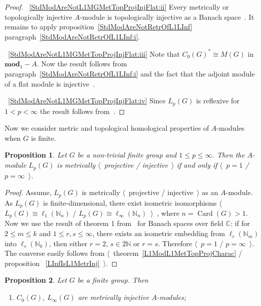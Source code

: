 \documentclass{article}
\theoremstyle{plain}
\newtheorem{proposition}{Proposition}[section]
\theoremstyle{definition}
\newtheorem{proof}{Proof}\def\theproof{}
\newcommand{\isom}{\mathop{\mathbin{\cong}}}
\begin{document}
\begin{fulltext}
\begin{proof}
~\ref{StdModAreNotL1MGMetTopProjInjFlat:ii} Every metrically or topologically
injective $A$-module is topologically injective as a Banach
space~\cite[proposition 3.8]{NemGeomProjInjFlatBanMod}. It remains to apply
proposition~\ref{StdModAreNotRetrOfL1LInf}
paragraph~\ref{StdModAreNotRetrOfL1LInf:i}.

~\ref{StdModAreNotL1MGMetTopProjInjFlat:iii} Note that ${C_0(G)}^*\isom M(G)$ in
$\mathbf{mod}_1-A$. Now the result follows from
paragraph~\ref{StdModAreNotRetrOfL1LInf:i} and the fact that the adjoint module
of a flat module is injective~\cite[proposition
2.21]{NemGeomProjInjFlatBanMod}.

~\ref{StdModAreNotL1MGMetTopProjInjFlat:iv} Since $L_p(G)$ is reflexive for
$1<p<\infty$ the result follows from~\cite[corollary
3.14]{NemGeomProjInjFlatBanMod}.
\end{proof}

Now we consider metric and topological homological properties of $A$-modules
when $G$ is finite.

\begin{proposition}\label{LpFinGrL1MGMetrInjProjCharac} Let $G$ be a non-trivial
finite group and $1\leq p\leq \infty$. Then the $A$-module $L_p(G)$ is
metrically $\langle$~projective / injective~$\rangle$ if and only if
$\langle$~$p=1$ / $p=\infty$~$\rangle$.
\end{proposition}
\begin{proof} 
Assume, $L_p(G)$ is metrically $\langle$~projective / injective~$\rangle$ as an
$A$-module. As $L_p(G)$ is finite-dimensional, there exist isometric
isomorphisms $\langle$~$L_p(G)\isom \ell_1(\mathbb{N}_n)$ / $L_p(G)\isom
\ell_\infty(\mathbb{N}_n)$~$\rangle$~\cite[proposition 3.8, paragraphs
\textup{(i)}, \textup{(ii)}]{NemGeomProjInjFlatBanMod}, where
$n=\operatorname{Card}(G)>1$. Now we use the result of theorem 1
from~\cite{LyubIsomEmdbFinDimLp} for Banach spaces over field $\mathbb{C}$: if
for $2\leq m\leq k$ and $1\leq r,s\leq \infty$, there exists an isometric
embedding from $\ell_r(\mathbb{N}_m)$ into $\ell_s(\mathbb{N}_k)$, then either
$r=2$, $s\in 2\mathbb{N}$ or $r=s$. Therefore $\langle$~$p=1$ /
$p=\infty$~$\rangle$. The converse easily follows from
$\langle$~theorem~\ref{L1ModL1MetTopProjCharac} / proposition
~\ref{LInfIsL1MetrInj}~$\rangle$.
\end{proof}

\begin{proposition}\label{StdModFinGrL1MGMetrInjProjFlatCharac} Let $G$ be a
finite group. Then
\begin{enumerate}[label = (\roman*)]
    \item $C_0(G)$, $L_\infty(G)$ are metrically injective 
    $A$-modules;\label{StdModFinGrL1MGMetrInjProjFlatCharac:i}
 

\end{enumerate}
\end{proposition}
\end{fulltext}
\end{document}
